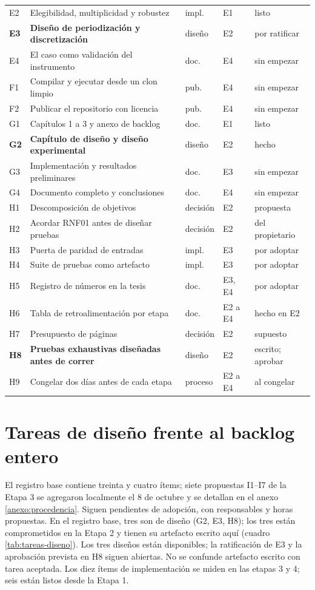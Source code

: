 {\begin{longtable}{L{0.55cm}L{6.8cm}L{1.45cm}L{1.2cm}L{2.2cm}}
E2 & Elegibilidad, multiplicidad y robustez & impl. & E1 & listo \\
\textbf{E3} & \textbf{Diseño de periodización y discretización} & diseño & E2 & por ratificar \\
E4 & El caso como validación del instrumento & doc. & E4 & sin empezar \\
F1 & Compilar y ejecutar desde un clon limpio & pub. & E4 & sin empezar \\
F2 & Publicar el repositorio con licencia & pub. & E4 & sin empezar \\
G1 & Capítulos 1 a 3 y anexo de backlog & doc. & E1 & listo \\
\textbf{G2} & \textbf{Capítulo de diseño y diseño experimental} & diseño & E2 & hecho \\
G3 & Implementación y resultados preliminares & doc. & E3 & sin empezar \\
G4 & Documento completo y conclusiones & doc. & E4 & sin empezar \\
H1 & Descomposición de objetivos & decisión & E2 & propuesta \\
H2 & Acordar RNF01 antes de diseñar pruebas & decisión & E2 & del propietario \\
H3 & Puerta de paridad de entradas & impl. & E3 & por adoptar \\
H4 & Suite de pruebas como artefacto & impl. & E3 & por adoptar \\
H5 & Registro de números en la tesis & doc. & E3, E4 & por adoptar \\
H6 & Tabla de retroalimentación por etapa & doc. & E2 a E4 & hecho en E2 \\
H7 & Presupuesto de páginas & decisión & E2 & supuesto \\
\textbf{H8} & \textbf{Pruebas exhaustivas diseñadas antes de correr} & diseño & E2 & escrito; aprobar \\
H9 & Congelar dos días antes de cada etapa & proceso & E2 a E4 & al congelar \\
\end{longtable}
}

\section{Tareas de diseño frente al backlog entero}
\label{sec:tareas-diseno}

El registro base contiene treinta y cuatro ítems; siete propuestas I1--I7 de la Etapa 3
se agregaron localmente el 8 de octubre y se detallan en el anexo \ref{anexo:procedencia}.
Siguen pendientes de adopción, con responsables y horas propuestas. En el registro base, tres son de diseño (G2, E3, H8); los tres están
comprometidos en la Etapa 2 y tienen su artefacto escrito aquí (cuadro
\ref{tab:tareas-diseno}). Los tres diseños están disponibles; la ratificación de E3 y la
aprobación prevista en H8 siguen abiertas. No se confunde artefacto escrito con tarea aceptada. Los diez ítems de implementación se miden en las
etapas 3 y 4; seis están listos desde la Etapa 1.

